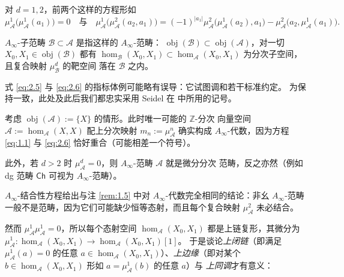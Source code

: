 对 $d=1,2$，前两个这样的方程形如
\[
  \mu^1_{\mathcal A}\bigl(\mu^1_{\mathcal A}(a_1)\bigr)=0
  \quad\text{与}\quad
  \mu^1_{\mathcal A}\bigl(\mu^2_{\mathcal A}(a_2,a_1)\bigr)
  =(-1)^{|a_1|}\mu^2_{\mathcal A}\bigl(\mu^1_{\mathcal A}(a_2),a_1\bigr)
  -\mu^2_{\mathcal A}\bigl(a_2,\mu^1_{\mathcal A}(a_1)\bigr).
\]

$A_\infty$-子范畴 $\mathcal B\subset\mathcal A$ 是指这样的 $A_\infty$-范畴：
$\operatorname{obj}(\mathcal B)\subset\operatorname{obj}(\mathcal A)$，对一切
$X_0,X_1\in\operatorname{obj}(\mathcal B)$ 都有 $\hom_{\mathcal B}(X_0,X_1)\subset
\hom_{\mathcal A}(X_0,X_1)$ 为分次子空间，且复合映射 $\mu^d_{\mathcal B}$ 的靶空间
落在 $\mathcal B$ 之内。

式 \eqref{eq:2.5} 与 \eqref{eq:2.6} 的指标体例可能略有误导：它试图调和若干标准约定。
为保持一致，此处及此后我们都忠实采用 Seidel 在 \cite{Sei08} 中所用的记号。

\begin{Rem}\label{rem:2.5}
考虑 $\operatorname{obj}(\mathcal A):=\{X\}$ 的情形。此时唯一可能的 $\mathbb Z$-分次
向量空间 $\mathcal A:=\hom_{\mathcal A}(X,X)$ 配上分次映射 $m_n:=\mu^n_{\mathcal A}$
确实构成 $A_\infty$-代数，因为方程 \eqref{eq:1.1} 与 \eqref{eq:2.6} 恰好重合（可能相差一个符号）。

此外，若 $d>2$ 时 $\mu^d_{\mathcal A}=0$，则 $A_\infty$-范畴 $\mathcal A$ 就是微分分次
范畴，反之亦然（例如 dg 范畴 $\mathsf{Ch}$ 可视为 $A_\infty$-范畴）。
\end{Rem}

$A_\infty$-结合性方程给出与注 \ref{rem:1.5} 中对 $A_\infty$-代数完全相同的结论：非幺
$A_\infty$-范畴一般不是范畴，因为它们可能缺少恒等态射，而且每个复合映射
$\mu^2_{\mathcal A}$ 未必结合。

然而 $\mu^1_{\mathcal A}\mu^1_{\mathcal A}=0$，所以每个态射空间
$\hom_{\mathcal A}(X_0,X_1)$ 都是上链复形，其微分为
$\mu^1_{\mathcal A}:\hom_{\mathcal A}(X_0,X_1)\to\hom_{\mathcal A}(X_0,X_1)[1]$。
于是谈论\emph{上闭链}（即满足 $\mu^1_{\mathcal A}(a)=0$ 的任意
$a\in\hom_{\mathcal A}(X_0,X_1)$）、\emph{上边缘}（即对某个
$b\in\hom_{\mathcal A}(X_0,X_1)$ 形如 $a=\mu^1_{\mathcal A}(b)$ 的任意 $a$）与
\emph{上同调}才有意义：


